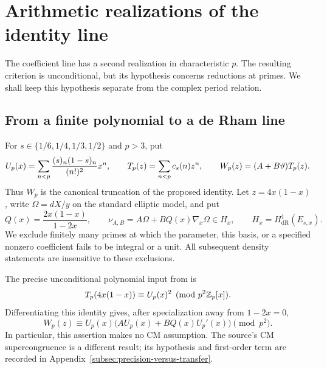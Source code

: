 \section{Arithmetic realizations of the identity line}
\label{sec:weighted-cartier-criterion}\label{sec:prime-tests}

The coefficient line has a second realization in characteristic $p$.
The resulting criterion is unconditional, but its hypothesis concerns
reductions at primes.  We shall keep this hypothesis separate from the
complex period relation.

\subsection{From a finite polynomial to a de Rham line}
For $s\in\{1/6,1/4,1/3,1/2\}$ and $p>3$, put
\[
 U_p(x)=\sum_{n<p}\frac{(s)_n(1-s)_n}{(n!)^2}x^n,
 \qquad T_p(z)=\sum_{n<p}c_s(n)z^n,
 \qquad W_p(z)=(A+B\vartheta)T_p(z).
\]
Thus $W_p$ is the canonical truncation of the proposed identity.
Let $z=4x(1-x)$, write $\Omega=dX/y$ on the standard elliptic
model, and put
\[
 Q(x)=\frac{2x(1-x)}{1-2x},\qquad
 \nu_{A,B}=A\Omega+BQ(x)\nabla_x\Omega\in H_x,
 \qquad H_x=H^1_{\mathrm{dR}}(E_{s,x}).
\]
We exclude finitely many primes at which the parameter, this basis,
or a specified nonzero coefficient fails to be integral or a unit.
All subsequent density statements are insensitive to these exclusions.

The precise unconditional polynomial input from
\cite[\S7, equation (7.4) and Lemma 7.2]{BRSTT} is
\begin{equation}\label{eq:finite-clausen-p2}
 T_p(4x(1-x))\equiv U_p(x)^2\pmod{p^2\mathbb Z_p[x]}.
\end{equation}
Differentiating this identity gives, after specialization away from
$1-2x=0$,
\begin{equation}\label{eq:cartier-weighted-factorization}
 W_p(z)\equiv U_p(x)\bigl(AU_p(x)+BQ(x)U_p'(x)\bigr)
                                                   \pmod{p^2}.
\end{equation}
In particular, this assertion makes no CM assumption.  The source's
CM supercongruence is a different result; its hypothesis and first-order
term are recorded in Appendix~\ref{subsec:precision-versus-transfer}.

